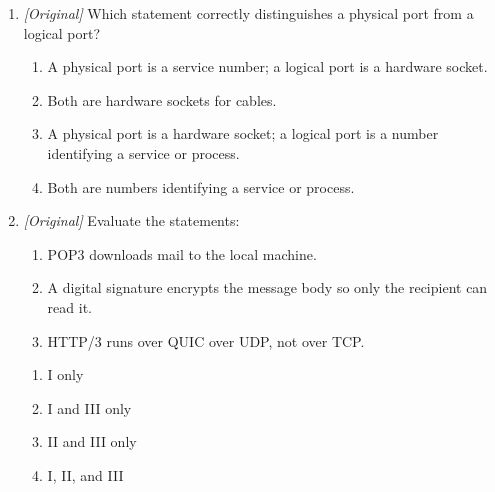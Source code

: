 \documentclass[11pt]{article}
\begin{document}
\begin{enumerate}[label=\textbf{Q\arabic*.}, leftmargin=*]
\begin{enumerate}[label=\Alph*.]
    \item DNS typed, URL resolves the IP address, browser reaches the domain name
    \item URL reaches the IP address, which resolves DNS
  \end{enumerate}
\item \textit{[Original]} Which statement correctly distinguishes a physical
  port from a logical port?
  \begin{enumerate}[label=\Alph*.]
    \item A physical port is a service number; a logical port is a hardware socket.
    \item Both are hardware sockets for cables.
    \item A physical port is a hardware socket; a logical port is a number
      identifying a service or process.
    \item Both are numbers identifying a service or process.
  \end{enumerate}
\item \textit{[Original]} Evaluate the statements:
  \begin{enumerate}[label=\Roman*.]
    \item POP3 downloads mail to the local machine.
    \item A digital signature encrypts the message body so only the recipient can read it.
    \item HTTP/3 runs over QUIC over UDP, not over TCP.
  \end{enumerate}
  \begin{enumerate}[label=\Alph*.]
    \item I only
    \item I and III only
    \item II and III only
    \item I, II, and III
  \end{enumerate}


\end{enumerate}
\end{document}
